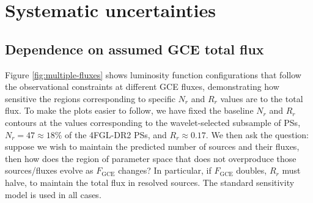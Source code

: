 \documentclass[letter,11pt]{article}
\begin{document}

\section{Systematic uncertainties}
\label{sec:further-discussion}



\subsection{Dependence on assumed GCE total flux}

Figure \ref{fig:multiple-fluxes} shows luminosity function configurations that follow the observational constraints at different GCE fluxes, demonstrating how sensitive the regions corresponding to specific $N_r$ and $R_r$ values are to the total flux. To make the plots easier to follow, we have fixed the baseline $N_r$ and $R_r$ contours at the values corresponding to the wavelet-selected subsample of PSs, $N_r=47\approx 18\%$ of the 4FGL-DR2 PSs, and $R_r \approx 0.17$. We then ask the question: suppose we wish to maintain the predicted number of sources and their fluxes, then how does the region of parameter space that does not overproduce those sources/fluxes evolve as $F_\text{GCE}$ changes? In particular, if $F_\text{GCE}$ doubles, $R_r$ must halve, to maintain the total flux in resolved sources. The standard sensitivity model is used in all cases.
\end{document}
